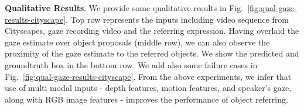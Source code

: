 \documentclass[10pt,twocolumn,letterpaper]{article}
\begin{document}

\noindent
\textbf{Qualitative Results}.
We provide some qualitative results in Fig.~\ref{fig:qual-gaze-results-cityscape}. Top row represents the inputs including video sequence from Cityscapes, gaze recording video and the referring expression. Having overlaid the gaze estimate over object proposals (middle row), we can also observe the proximity of the gaze estimate to the referred objects. We show the predicted and groundtruth box in the bottom row. We add also some failure cases in Fig.~\ref{fig:qual-gaze-results-cityscape}. From the above experiments, we infer that use of multi modal inputs - depth features, motion features, and speaker's gaze, along with RGB image features - improves the performance of object referring. 

\end{document}
